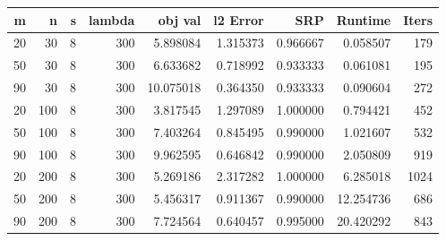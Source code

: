\begin{tabular}{rrrrrrrrr}
\toprule
 m &   n &  s &  lambda &   obj val &  l2 Error &      SRP &   Runtime &  Iters \\
\midrule
20 &  30 &  8 &     300 &  5.898084 &  1.315373 & 0.966667 &  0.058507 &    179 \\
50 &  30 &  8 &     300 &  6.633682 &  0.718992 & 0.933333 &  0.061081 &    195 \\
90 &  30 &  8 &     300 & 10.075018 &  0.364350 & 0.933333 &  0.090604 &    272 \\
20 & 100 &  8 &     300 &  3.817545 &  1.297089 & 1.000000 &  0.794421 &    452 \\
50 & 100 &  8 &     300 &  7.403264 &  0.845495 & 0.990000 &  1.021607 &    532 \\
90 & 100 &  8 &     300 &  9.962595 &  0.646842 & 0.990000 &  2.050809 &    919 \\
20 & 200 &  8 &     300 &  5.269186 &  2.317282 & 1.000000 &  6.285018 &   1024 \\
50 & 200 &  8 &     300 &  5.456317 &  0.911367 & 0.990000 & 12.254736 &    686 \\
90 & 200 &  8 &     300 &  7.724564 &  0.640457 & 0.995000 & 20.420292 &    843 \\
\bottomrule
\end{tabular}
